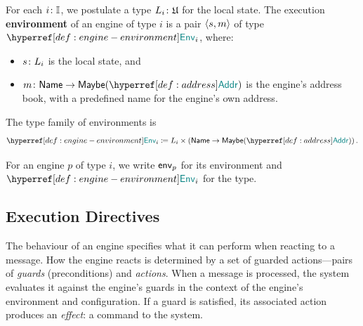 \documentclass[
  a4paper,        %
  techreport,     %
]{art}
\begin{document}
\begin{definition}\label{def:engine-environment}%
For each $i\colon\mathbb{I}$, we postulate a type $L_i\colon\mathfrak{U}$ for
the local state. The execution \textbf{environment} of an engine of type $i$
is a pair $\langle s, m \rangle$ of type $\envtype{i}$, where:
\begin{itemize}
    \item $s\colon L_i$ is the local state, and
    \item $\typing{m}{\Name \to \Option{\Address}}$ is the engine's address book, with
    a predefined name \self for the engine's own address.
\end{itemize}
The type family of environments is
\begin{equation}\label{eq:engine-environment-type}
\defequal{
  \envtype{i}
}{
  L_i \times (\Name \to \Option{\Address})
}\,.
\end{equation}
\end{definition}

For an engine $p$ of type $i$, we write $\mathsf{env}_{p}$ for its environment
and $\envtype{i}$ for the type.

\subsection{Execution Directives}\label{sec:execution-directives}

The behaviour of an engine specifies what it can perform when reacting to a
message. How the engine reacts is determined by a set of guarded
actions---pairs of \emph{guards} (preconditions) and \emph{actions}. When a
message is processed, the system evaluates it against the engine's guards in
the context of the engine's environment and configuration. If a guard is
satisfied, its associated action produces an \emph{effect}: a command to the
system.
\end{document}
